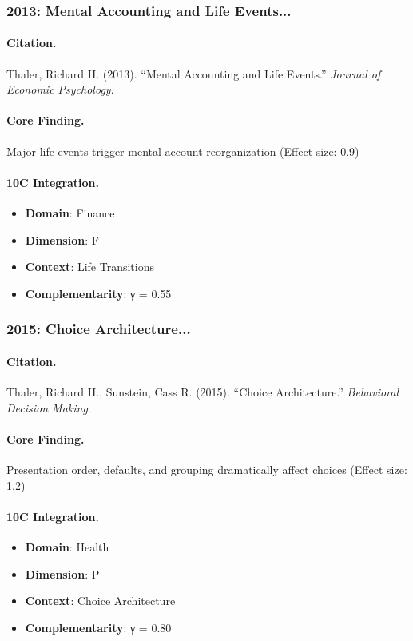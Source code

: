 \subsubsection{2013: Mental Accounting and Life Events...}

\paragraph{Citation.}
Thaler, Richard H. (2013). ``Mental Accounting and Life Events.''
\textit{Journal of Economic Psychology}.

\paragraph{Core Finding.}
Major life events trigger mental account reorganization (Effect size: 0.9)

\paragraph{10C Integration.}
\begin{itemize}[nosep]
  \item \textbf{Domain}: Finance
  \item \textbf{Dimension}: F
  \item \textbf{Context}: Life Transitions
  \item \textbf{Complementarity}: γ = 0.55
\end{itemize}

\subsubsection{2015: Choice Architecture...}

\paragraph{Citation.}
Thaler, Richard H., Sunstein, Cass R. (2015). ``Choice Architecture.''
\textit{Behavioral Decision Making}.

\paragraph{Core Finding.}
Presentation order, defaults, and grouping dramatically affect choices (Effect size: 1.2)

\paragraph{10C Integration.}
\begin{itemize}[nosep]
  \item \textbf{Domain}: Health
  \item \textbf{Dimension}: P
  \item \textbf{Context}: Choice Architecture
  \item \textbf{Complementarity}: γ = 0.80
\end{itemize}

